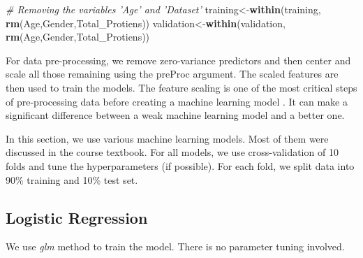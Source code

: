 \documentclass[]{article}
\newenvironment{Shaded}{\begin{snugshade}}{\end{snugshade}}
\newcommand{\CommentTok}[1]{\textcolor[rgb]{0.56,0.35,0.01}{\textit{#1}}}
\newcommand{\DataTypeTok}[1]{\textcolor[rgb]{0.13,0.29,0.53}{#1}}
\newcommand{\DecValTok}[1]{\textcolor[rgb]{0.00,0.00,0.81}{#1}}
\newcommand{\FloatTok}[1]{\textcolor[rgb]{0.00,0.00,0.81}{#1}}
\newcommand{\KeywordTok}[1]{\textcolor[rgb]{0.13,0.29,0.53}{\textbf{#1}}}
\newcommand{\NormalTok}[1]{#1}
\newcommand{\OperatorTok}[1]{\textcolor[rgb]{0.81,0.36,0.00}{\textbf{#1}}}
\newcommand{\StringTok}[1]{\textcolor[rgb]{0.31,0.60,0.02}{#1}}
\begin{document}
\begin{Shaded}
\begin{Highlighting}[]
\CommentTok{# Removing the variables 'Age' and 'Dataset' }
\NormalTok{training<-}\KeywordTok{within}\NormalTok{(training, }\KeywordTok{rm}\NormalTok{(Age,Gender,Total_Protiens))}
\NormalTok{validation<-}\KeywordTok{within}\NormalTok{(validation, }\KeywordTok{rm}\NormalTok{(Age,Gender,Total_Protiens))}
\end{Highlighting}
\end{Shaded}

For data pre-processing, we remove zero-variance predictors and then
center and scale all those remaining using the preProc argument. The
scaled features are then used to train the models. The feature scaling
is one of the most critical steps of pre-processing data before creating
a machine learning model \cite{fs}. It can make a significant difference between a
weak machine learning model and a better one.

In this section, we use various machine learning models. Most of them
were discussed in the course textbook. For all models, we use
cross-validation of 10 folds and tune the hyperparameters (if possible).
For each fold, we split data into 90\% training and 10\% test set.

\subsection{Logistic Regression}

We use \emph{glm} method to train the model. There is no parameter
tuning involved.

\begin{Shaded}
\end{Shaded}
\end{document}

